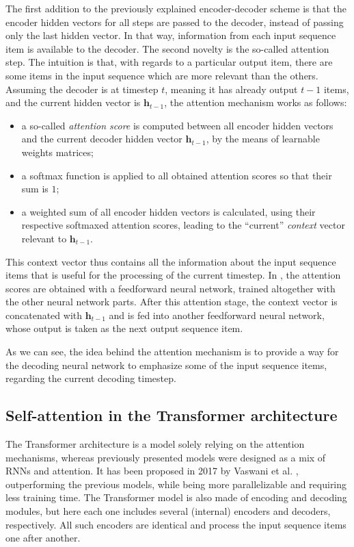 The first addition to the previously explained encoder-decoder scheme is that the encoder hidden vectors for all steps are passed to the decoder, instead of passing only the last hidden vector. In that way, information from each input sequence item is available to the decoder. The second novelty is the so-called attention step. The intuition is that, with regards to a particular output item, there are some items in the input sequence which are more relevant than the others. Assuming the decoder is at timestep $t$, meaning it has already output $t-1$ items, and the current hidden vector is $\mathbf{h}_{t-1}$, the attention mechanism works as follows:
\begin{itemize}
    \item a so-called \emph{attention score} is computed between all encoder hidden vectors and the current decoder hidden vector $\mathbf{h}_{t-1}$, by the means of learnable weights matrices;
    \item a softmax function is applied to all obtained attention scores so that their sum is $1$;
    \item a weighted sum of all encoder hidden vectors is calculated, using their respective softmaxed attention scores, leading to the ``current'' \textit{context} vector relevant to $\mathbf{h}_{t-1}$.
\end{itemize}
This context vector thus contains all the information about the input sequence items that is useful for the processing of the current timestep. In \cite{bahdanau_neural_2015}, the attention scores are obtained with a feedforward neural network, trained altogether with the other neural network parts. After this attention stage, the context vector is concatenated with $\mathbf{h}_{t-1}$ and is fed into another feedforward neural network, whose output is taken as the next output sequence item.

As we can see, the idea behind the attention mechanism is to provide a way for the decoding neural network to emphasize some of the input sequence items, regarding the current decoding timestep.

\subsection{Self-attention in the Transformer architecture}

The Transformer architecture is a model solely relying on the attention mechanisms, whereas previously presented models were designed as a mix of RNNs and attention. It has been proposed in 2017 by Vaswani et al. \cite{vaswani_attention_2017}, outperforming the previous models, while being more parallelizable and requiring less training time. The Transformer model is also made of encoding and decoding modules, but here each one includes several (internal) encoders and decoders, respectively. All such encoders are identical and process the input sequence items one after another.

